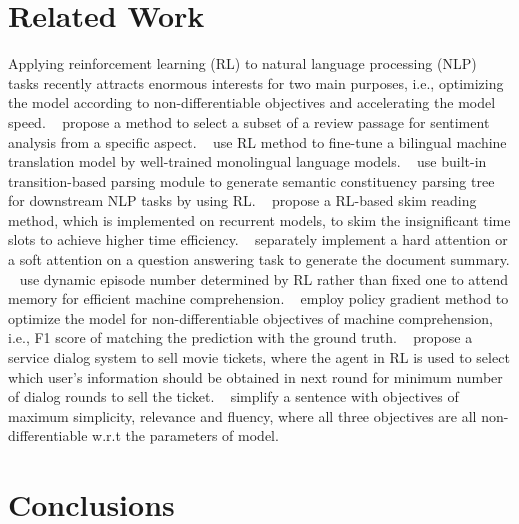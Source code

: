 \documentclass{article}
\begin{document}
\section{Related Work} \label{ext:related}

Applying reinforcement learning (RL) to natural language processing (NLP) tasks recently attracts enormous interests for two main purposes, i.e., optimizing the model according to non-differentiable objectives and accelerating the model speed. 
\citeauthor{lei2016rationalizing}~ propose a method to select a subset of a review passage for sentiment analysis from a specific aspect.
\citeauthor{he2016dual}~ use RL method to fine-tune a bilingual machine translation model by well-trained monolingual language models.
\citeauthor{yogatama2016learning}~ use built-in transition-based parsing module to generate semantic constituency parsing tree for downstream NLP tasks by using RL. 
\citeauthor{yu2017learning}~ propose a RL-based skim reading method, which is implemented on recurrent models, to skim the insignificant time slots to achieve higher time efficiency. 
\citeauthor{choi2017coarse}~ separately implement a hard attention or a soft attention on a question answering task to generate the document summary.
\citeauthor{shen2017reasonet}~ use dynamic episode number determined by RL rather than fixed one to attend memory for efficient machine comprehension.
\citeauthor{hu2017reinforced}~ employ policy gradient method to optimize the model for non-differentiable objectives of machine comprehension, i.e., F1 score of matching the prediction with the ground truth.
\citeauthor{li2017end}~ propose a service dialog system to sell movie tickets, where the agent in RL is used to select which user's information should be obtained in next round for minimum number of dialog rounds to sell the ticket. 
\citeauthor{zhang2017sentence}~ simplify a sentence with objectives of maximum simplicity, relevance and fluency, where all three objectives are all non-differentiable w.r.t the parameters of model. 




\section{Conclusions} \label{ext:conclusion}
\end{document}
